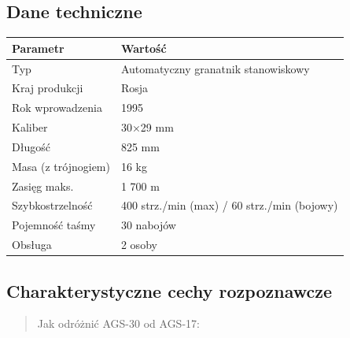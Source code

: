 \documentclass[12pt,oneside]{book}
\begin{document}
\subsection{Dane techniczne}\label{dane-techniczne-98}

\begin{longtable}[]{@{}ll@{}}
\toprule\noalign{}
Parametr & Wartość \\
\midrule\noalign{}
\endhead
\bottomrule\noalign{}
\endlastfoot
Typ & Automatyczny granatnik stanowiskowy \\
Kraj produkcji & Rosja \\
Rok wprowadzenia & 1995 \\
Kaliber & 30×29 mm \\
Długość & 825 mm \\
Masa (z trójnogiem) & 16 kg \\
Zasięg maks. & 1 700 m \\
Szybkostrzelność & 400 strz./min (max) / 60 strz./min (bojowy) \\
Pojemność taśmy & 30 nabojów \\
Obsługa & 2 osoby \\
\end{longtable}

\subsection{Charakterystyczne cechy
rozpoznawcze}\label{charakterystyczne-cechy-rozpoznawcze-98}

\begin{quote}
Jak odróżnić AGS-30 od AGS-17:
\end{quote}
\end{document}
